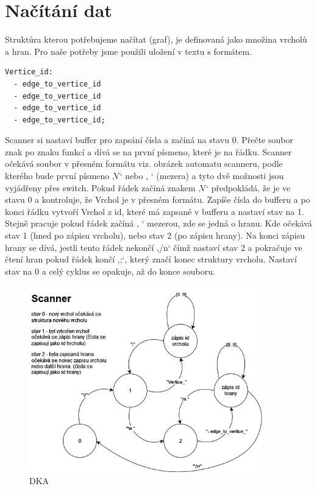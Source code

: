 \section{Načítání dat}

Struktůra kterou potřebujeme načítat (graf), je definovaná jako množina vrcholů a hran. Pro naše potřeby
jsme použili uložení v textu s formátem.

\begin{lstlisting}
Vertice_id:
  - edge_to_vertice_id
  - edge_to_vertice_id
  - edge_to_vertice_id
  - edge_to_vertice_id;
\end{lstlisting}

Scanner si nastaví buffer pro zapsání čísla a začíná na stavu 0. Přečte soubor znak po znaku funkcí a dívá se na první písmeno, které je na řádku. Scanner očekává soubor v přesném formátu viz. obrázek automatu scanneru, podle kterého bude první písmeno ‚V‘ nebo ‚ ‘ (mezera) a tyto dvě možnosti jsou vyjádřeny přes switch. Pokud řádek začíná znakem ‚V‘ předpokládá, že je ve stavu 0 a kontroluje, že Vrchol je v přesném formátu. Zapíše čísla do bufferu a po konci řádku vytvoří Vrchol z id, které má zapsané v bufferu a nastaví stav na 1. Stejně pracuje pokud řádek začíná ‚ ‘ mezerou, zde se jedná o hranu. Kde očekává stav 1 (hned po zápisu vrcholu), nebo stav 2 (po zápisu hrany). Na konci zápisu hrany se dívá, jestli tento řádek nekončí ‚/n‘ čímž nastaví stav 2 a pokračuje ve čtení hran pokud řádek končí ‚;‘, který značí konec struktury vrcholu. Nastaví stav na 0 a celý cyklus se opakuje, až do konce souboru.

\begin{figure}[h]
    \centering
    \includegraphics[width=0.9\textwidth]{doc/fig/Scanner_automat_Final.drawio.png}
    \caption{DKA}
    \label{fig:DKA}
\end{figure}


\newpage
